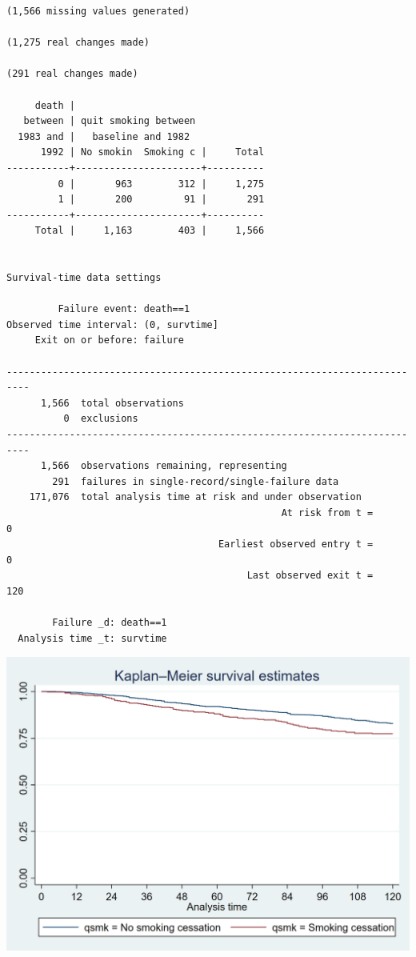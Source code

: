 \documentclass[
  10pt,
  a4paper,
]{book}
\begin{document}
\begin{verbatim}
(1,566 missing values generated)

(1,275 real changes made)

(291 real changes made)

     death |
   between | quit smoking between
  1983 and |   baseline and 1982
      1992 | No smokin  Smoking c |     Total
-----------+----------------------+----------
         0 |       963        312 |     1,275 
         1 |       200         91 |       291 
-----------+----------------------+----------
     Total |     1,163        403 |     1,566 


Survival-time data settings

         Failure event: death==1
Observed time interval: (0, survtime]
     Exit on or before: failure

--------------------------------------------------------------------------
      1,566  total observations
          0  exclusions
--------------------------------------------------------------------------
      1,566  observations remaining, representing
        291  failures in single-record/single-failure data
    171,076  total analysis time at risk and under observation
                                                At risk from t =         0
                                     Earliest observed entry t =         0
                                          Last observed exit t =       120

        Failure _d: death==1
  Analysis time _t: survtime
\end{verbatim}

\begin{center}\includegraphics[width=0.85\linewidth]{./figs/stata-fig-17-1} \end{center}
\end{document}
